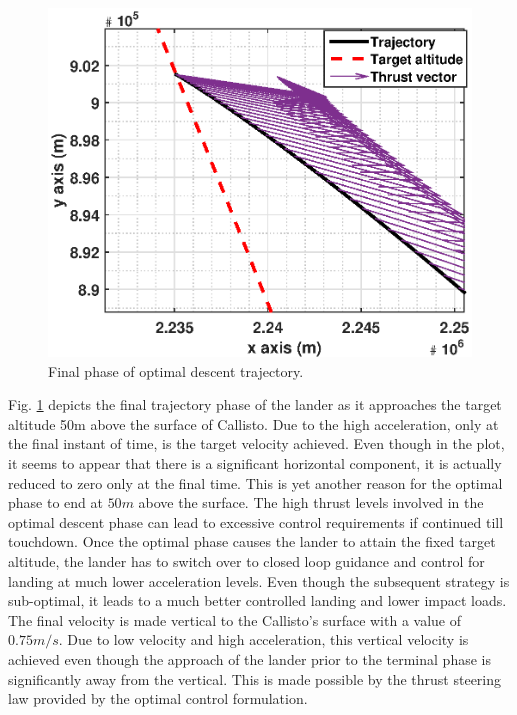 \begin{figure}[H]
	\centering\includegraphics[width=0.9\linewidth]{Traj_end.eps}
	\caption{Final phase of optimal descent trajectory.}
	\label{traj_end}
\end{figure}
Fig. \ref{traj_end} depicts the final trajectory phase of the lander as it approaches the target altitude 50m above the surface of Callisto. Due to the high acceleration, only at the final instant of time, is the target velocity achieved. Even though in the plot, it seems to appear that there is a significant horizontal component, it is actually reduced to zero only at the final time. This is yet another reason for the optimal phase to end at $50m$ above the surface. The high thrust levels involved in the optimal descent phase can lead to excessive control requirements if continued till touchdown. Once the optimal phase causes the lander to attain the fixed target altitude, the lander has to switch over to closed loop guidance and control for landing at much lower acceleration levels. Even though the subsequent strategy is sub-optimal, it leads to a much better controlled landing and lower impact loads. The final velocity is made vertical to the Callisto's surface with a value of $0.75m/s$. Due to low velocity and high acceleration, this vertical velocity is achieved even though the approach of the lander prior to the terminal phase is significantly away from the vertical. This is made possible by the thrust steering law provided by the optimal control formulation.\\
